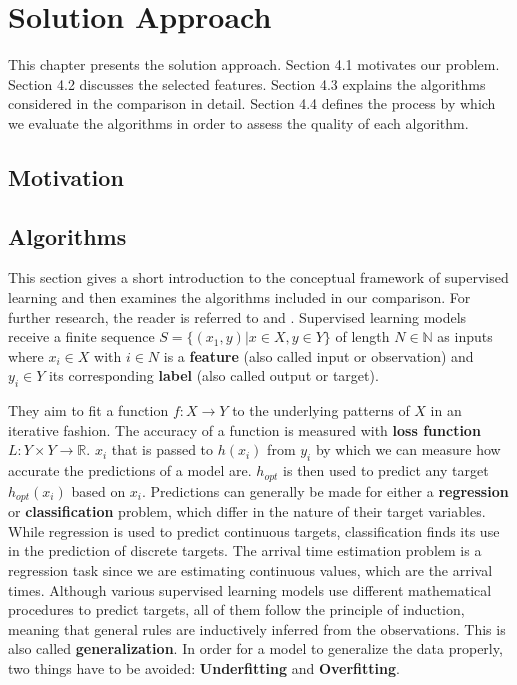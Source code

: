 

\chapter{Solution Approach}
This chapter presents the solution approach.
Section 4.1 motivates our problem. 
Section 4.2 discusses the selected features.
Section 4.3 explains the algorithms considered in the comparison in detail.
Section 4.4 defines the process by which we evaluate the algorithms in order to assess the quality of each algorithm.

\section{Motivation}



\section{Algorithms}
This section gives a short introduction to the conceptual framework of supervised learning and then examines the algorithms included in our comparison. For further research, the reader is referred to \cite{Bishop} and \cite{SLFoundations}.
\newline
\newline
Supervised learning models receive a finite sequence 
$S = \{(x_1, y) | x \in X, y \in Y\}$ of length $N \in \mathbb{N}$ as inputs where $x_i \in X$ with $i \in N$ is a \textbf{feature} (also called input or observation) and $y_i \in Y$ its corresponding \textbf{label} (also called output or target). 

They aim to fit a function $f: X \to Y$ to the underlying patterns of $X$ in an iterative fashion. 
The accuracy of a function is measured with \textbf{loss function} $L: Y \times Y \to \mathbb{R}$. $x_i$ that is passed to $h(x_i)$ from $y_i$ by which we can measure how accurate the predictions of a model are. $h_{opt}$ is then used to predict any target $h_{opt}(x_i)$ based on $x_i$.  
\newline
Predictions can generally be made for either a \textbf{regression} or \textbf{classification} problem, which differ in the nature of their target variables. While regression is used to predict continuous targets, classification finds its use in the prediction of discrete targets. The arrival time estimation problem is a regression task since we are estimating continuous values, which are the arrival times. 
Although various supervised learning models use different mathematical procedures to predict targets, all of them follow the principle of induction, meaning that general rules are inductively inferred from the observations. This is also called \textbf{generalization}.  
In order for a model to generalize the data properly, two things have to be avoided: \textbf{Underfitting} and \textbf{Overfitting}.



